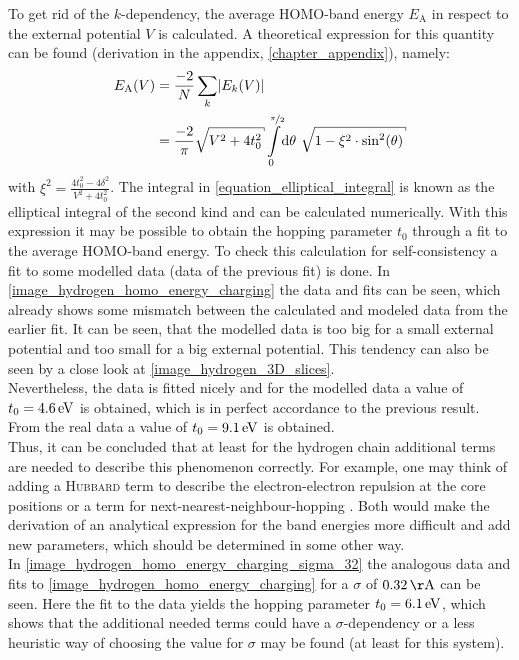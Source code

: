 \newpage To get rid of the $k$-dependency, the average HOMO-band energy $E_\text{A}$ in respect to the external potential $V$ is calculated. A theoretical expression for this quantity can be found (derivation in the appendix, \cref{chapter_appendix}), namely:
\begin{align}
	E_\text{A}(V) &= \frac{-2}{N}\sum_k \left|E_k(V)\right|\\
				  &= \frac{-2}{\pi}\sqrt{V^2+4t_0^2}\int\limits_0^{\nicefrac{\pi}{2}}\dd\theta\ \sqrt{1-\xi^2\cdot\sin^2(\theta)}
				  \label{equation_elliptical_integral}
\end{align}
with $\xi^2 = \frac{4t_0^2-4\delta^2}{V^2+4t_0^2}$. The integral in \cref{equation_elliptical_integral} is known as the elliptical integral of the second kind and can be calculated numerically. With this expression it may be possible to obtain the hopping parameter $t_0$ through a fit to the average HOMO-band energy. To check this calculation for self-consistency a fit to some modelled data (data of the previous fit) is done. In \cref{image_hydrogen_homo_energy_charging} the data and fits can be seen, which already shows some mismatch between the calculated and modeled data from the earlier fit. It can be seen, that the modelled data is too big for a small external potential and too small for a big external potential. This tendency can also be seen by a close look at \cref{image_hydrogen_3D_slices}.\\
Nevertheless, the data is fitted nicely and for the modelled data a value of $t_0 = \unit[4.6]{eV}$ is obtained, which is in perfect accordance to the previous result. From the real data a value of $t_0 = \unit[9.1]{eV}$ is obtained.\\
Thus, it can be concluded that at least for the hydrogen chain additional terms are needed to describe this phenomenon correctly. For example, one may think of adding a \textsc{Hubbard} term to describe the electron-electron repulsion at the core positions or a term for next-nearest-neighbour-hopping \cite{PhysRevLett.103.067004,PhysRevB.82.155141}. Both would make the derivation of an analytical expression for the band energies more difficult and add new parameters, which should be determined in some other way.\\ In \cref{image_hydrogen_homo_energy_charging_sigma_32} the analogous data and fits to \cref{image_hydrogen_homo_energy_charging} for a $\sigma$ of $\unit[0.32]{\AA}$ can be seen. Here the fit to the data yields the hopping parameter $t_0 = \unit[6.1]{eV}$, which shows that the additional needed terms could have a $\sigma$-dependency or a less heuristic way of choosing the value for $\sigma$ may be found (at least for this system).\\
